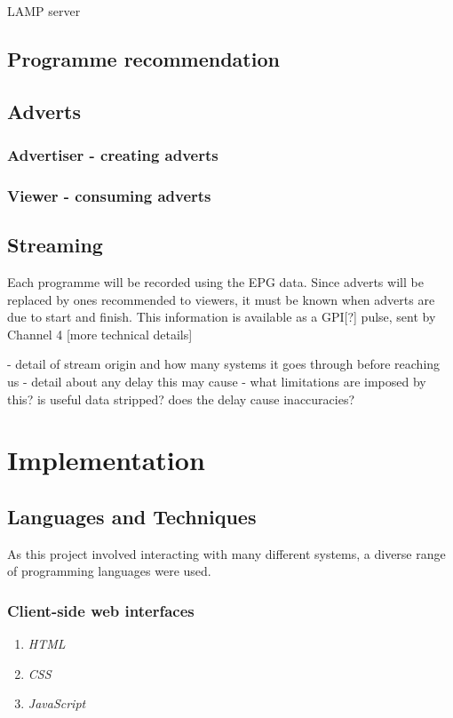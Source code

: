 \documentclass[12pt,a4paper,twoside, titlepage, openright, cleardoublepage=empty]{article}
\begin{document}
LAMP server

\subsection{Programme recommendation}

\subsection{Adverts}

\subsubsection{Advertiser - creating adverts}

\subsubsection{Viewer - consuming adverts}

\subsection{Streaming}
Each programme will be recorded using the EPG data. Since adverts will be replaced by ones recommended to viewers, it must be known when adverts are due to start and finish. This information is available as a GPI[?] pulse, sent by Channel 4 [more technical details]

- detail of stream origin and how many systems it goes through before reaching us
- detail about any delay this may cause
- what limitations are imposed by this? is useful data stripped? does the delay cause inaccuracies?


\cleardoublepage

\section{Implementation}

\subsection{Languages and Techniques}
As this project involved interacting with many different systems, a diverse range of programming languages were used.

\subsubsection{Client-side web interfaces}
\begin{enumerate}
\item \textit{HTML}
\item \textit{CSS}
\item \textit{JavaScript}
\end{enumerate}
\end{document}
